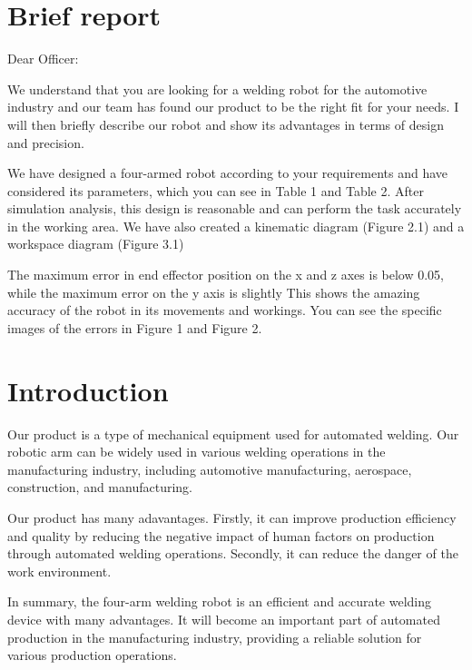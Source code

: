 \section{Brief report}

	\noindent Dear Officer:
	
	\noindent We understand that you are looking for a welding robot for the automotive industry and our team has found our product to be the right fit for your needs. I will then briefly describe our robot and show its advantages in terms of design and precision.
	
	\noindent We have designed a four-armed robot according to your requirements and have considered its parameters, which you can see in Table 1 and Table 2. After simulation analysis, this design is reasonable and can perform the task accurately in the working area. We have also created a kinematic diagram (Figure 2.1) and a workspace diagram (Figure 3.1)
	
	\noindent The maximum error in end effector position on the x and z axes is below 0.05, while the maximum error on the y axis is slightly This shows the amazing accuracy of the robot in its movements and workings. You can see the specific images of the errors in Figure 1 and Figure 2.

\section{Introduction}
\FloatBarrier %

Our product is a type of mechanical equipment used for automated welding. Our robotic arm can be widely used in various welding operations in the manufacturing industry, including automotive manufacturing, aerospace, construction, and manufacturing.

Our product has many adavantages. Firstly, it can improve production efficiency and quality by reducing the negative impact of human factors on production through automated welding operations. Secondly, it can reduce the danger of the work environment. 

In summary, the four-arm welding robot is an efficient and accurate welding device with many advantages. It will become an important part of automated production in the manufacturing industry, providing a reliable solution for various production operations.









